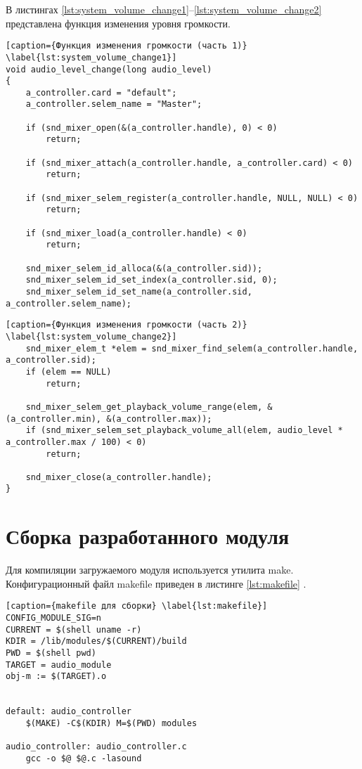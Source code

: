 В листингах \ref{lst:system_volume_change1}--\ref{lst:system_volume_change2} представлена функция изменения уровня громкости.

\begin{lstlisting}[caption={Функция изменения громкости (часть 1)} \label{lst:system_volume_change1}]
void audio_level_change(long audio_level)
{
    a_controller.card = "default";
    a_controller.selem_name = "Master";

    if (snd_mixer_open(&(a_controller.handle), 0) < 0)
        return;

    if (snd_mixer_attach(a_controller.handle, a_controller.card) < 0)
        return;

    if (snd_mixer_selem_register(a_controller.handle, NULL, NULL) < 0)
        return;

    if (snd_mixer_load(a_controller.handle) < 0)
        return;

    snd_mixer_selem_id_alloca(&(a_controller.sid));
    snd_mixer_selem_id_set_index(a_controller.sid, 0);
    snd_mixer_selem_id_set_name(a_controller.sid, a_controller.selem_name);
\end{lstlisting}

\clearpage

\begin{lstlisting}[caption={Функция изменения громкости (часть 2)} \label{lst:system_volume_change2}]
    snd_mixer_elem_t *elem = snd_mixer_find_selem(a_controller.handle, a_controller.sid);
    if (elem == NULL)
        return;

    snd_mixer_selem_get_playback_volume_range(elem, &(a_controller.min), &(a_controller.max));
    if (snd_mixer_selem_set_playback_volume_all(elem, audio_level * a_controller.max / 100) < 0)
        return;

    snd_mixer_close(a_controller.handle);
}
\end{lstlisting}

\section{Сборка разработанного модуля}

Для компиляции загружаемого модуля используется утилита make. Конфигурационный файл makefile приведен в листинге \ref{lst:makefile} \cite{makefile}.

\begin{lstlisting}[caption={makefile для сборки} \label{lst:makefile}]
CONFIG_MODULE_SIG=n
CURRENT = $(shell uname -r)
KDIR = /lib/modules/$(CURRENT)/build
PWD = $(shell pwd)
TARGET = audio_module
obj-m := $(TARGET).o


default: audio_controller
	$(MAKE) -C$(KDIR) M=$(PWD) modules
  
audio_controller: audio_controller.c
	gcc -o $@ $@.c -lasound
\end{lstlisting}